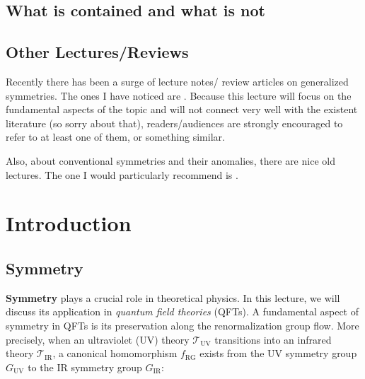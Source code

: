 \documentclass[11pt,toc=bibliography]{scrbook}
\numberwithin{equation}{section}
\begin{document}
\section*{What is contained and what is
not}\label{what-is-contained-and-what-is-not}


\section*{Other Lectures/Reviews}\label{other-lecturesreviews}


Recently there has been a surge of lecture notes/ review articles on
generalized symmetries. The ones I have noticed are
\autocite{McGreevy:2022oyu,Schafer-Nameki:2023jdn,Gomes:2023ahz,Bhardwaj:2023kri,Luo:2023ive,Shao:2023gho}.
Because this lecture will focus on the fundamental aspects of the topic
and will not connect very well with the existent literature (so sorry
about that), readers/audiences are strongly encouraged to refer to at
least one of them, or something similar.

Also, about conventional symmetries and their anomalies, there are nice
old lectures. The one I would particularly recommend is
\autocite{TachikawaTasi}.


\chapter{Introduction}\label{introduction}

\section{Symmetry}\label{symmetry}

\textbf{Symmetry} plays a crucial role in theoretical physics. In this
lecture, we will discuss its application in \emph{quantum field
theories} (QFTs). A fundamental aspect of symmetry in QFTs is its
preservation along the renormalization group flow. More precisely, when
an ultraviolet (UV) theory \(\mathcal{T}_\text{UV}\) transitions into an
infrared theory \(\mathcal{T}_\text{IR}\), a canonical homomorphism
\(f_\text{RG}\) exists from the UV symmetry group \(G_\text{UV}\) to the
IR symmetry group \(G_\text{IR}\):
\end{document}
